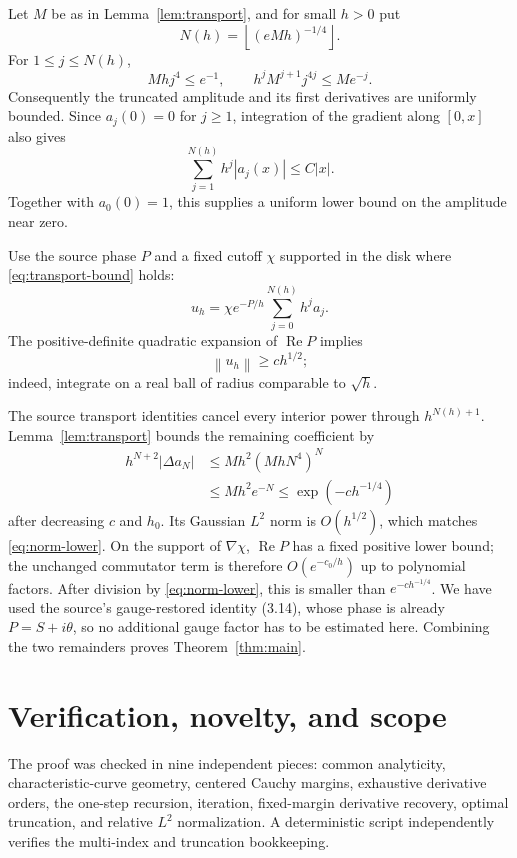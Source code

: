\documentclass[11pt]{article}
\newcommand{\norm}[1]{\left\lVert#1\right\rVert}
\begin{document}
Let $M$ be as in Lemma~\ref{lem:transport}, and for small $h>0$ put
\[
 N(h)=\left\lfloor(eMh)^{-1/4}\right\rfloor.
\]
For $1\leq j\leq N(h)$,
\[
 Mh j^4\leq e^{-1},
 \qquad
 h^jM^{j+1}j^{4j}\leq M e^{-j}.
\]
Consequently the truncated amplitude and its first derivatives are uniformly
bounded.  Since $a_j(0)=0$ for $j\geq1$, integration of the gradient along
$[0,x]$ also gives
\[
 \sum_{j=1}^{N(h)}h^j|a_j(x)|\leq C|x|.
\]
Together with $a_0(0)=1$, this supplies a uniform lower bound on the amplitude
near zero.

Use the source phase $P$ and a fixed cutoff $\chi$ supported in the disk where
\eqref{eq:transport-bound} holds:
\[
 u_h=\chi e^{-P/h}\sum_{j=0}^{N(h)}h^ja_j.
\]
The positive-definite quadratic expansion of $\operatorname{Re}P$ implies
\begin{equation}\label{eq:norm-lower}
 \norm{u_h}\geq c h^{1/2};
\end{equation}
indeed, integrate on a real ball of radius comparable to $\sqrt h$.

The source transport identities cancel every interior power through
$h^{N(h)+1}$.  Lemma~\ref{lem:transport} bounds the remaining coefficient by
\begin{align*}
 h^{N+2}|\Delta a_N|
 &\leq Mh^2(MhN^4)^N\\
 &\leq Mh^2e^{-N}
 \leq \exp(-c h^{-1/4})
\end{align*}
after decreasing $c$ and $h_0$.  Its Gaussian $L^2$ norm is $O(h^{1/2})$,
which matches \eqref{eq:norm-lower}.  On the support of $\nabla\chi$,
$\operatorname{Re}P$ has a fixed positive lower bound; the unchanged
commutator term is therefore $O(e^{-c_0/h})$ up to polynomial factors.
After division by \eqref{eq:norm-lower}, this is smaller than
$e^{-c h^{-1/4}}$.  We have used the source's gauge-restored identity (3.14),
whose phase is already $P=S+i\theta$, so no additional gauge factor has to be
estimated here.  Combining the two remainders proves
Theorem~\ref{thm:main}.

\section{Verification, novelty, and scope}

The proof was checked in nine independent pieces: common analyticity,
characteristic-curve geometry, centered Cauchy margins, exhaustive derivative
orders, the one-step recursion, iteration, fixed-margin derivative recovery,
optimal truncation, and relative $L^2$ normalization.  A deterministic script
independently verifies the multi-index and truncation bookkeeping.
\end{document}
